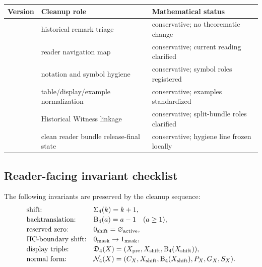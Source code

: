 \begin{center}
\scriptsize
\setlength{\tabcolsep}{2pt}
\begin{tabular}{@{}p{}P{0.36\textwidth}P{0.36\textwidth}@{}}
\toprule
Version & Cleanup role & Mathematical status\\
\midrule
{} & historical remark triage & conservative; no theorematic change\\
 & reader navigation map & conservative; current reading clarified\\
 & notation and symbol hygiene & conservative; symbol roles registered\\
 & table/display/example normalization & conservative; examples standardized\\
 & Historical Witness linkage & conservative; split-bundle roles clarified\\
 & clean reader bundle release-final state & conservative; hygiene line frozen locally\\
\bottomrule
\end{tabular}
\end{center}

\subsection{Reader-facing invariant checklist}
\label{subsec:v406-reader-facing-invariant-checklist}

\begin{definition}
\label{def:v406-reader-facing-invariant-checklist}
The following invariants are preserved by the cleanup sequence:
\[
\begin{array}{ll}
\text{shift:} & \Sigma_4(k)=k+1,\\[0.2em]
\text{backtranslation:} & \mathrm B_4(a)=a-1\quad(a\geq1),\\[0.2em]
\text{reserved zero:} & 0_{\mathrm{shift}}=\varnothing_{\mathrm{active}},\\[0.2em]
$\text{HC-boundary shift:}$  & 0_{\mathrm{mask}}\to1_{\mathrm{mask}},\\[0.2em]
\text{display triple:} & \mathfrak D_4(X)=(X_{\mathrm{pre}},X_{\mathrm{shift}},\mathrm B_4(X_{\mathrm{shift}})),\\[0.2em]
\text{normal form:} & \mathcal N_4(X)=(C_X,X_{\mathrm{shift}},\mathrm B_4(X_{\mathrm{shift}}),P_X,G_X,S_X).
\end{array}
\]
\end{definition}

